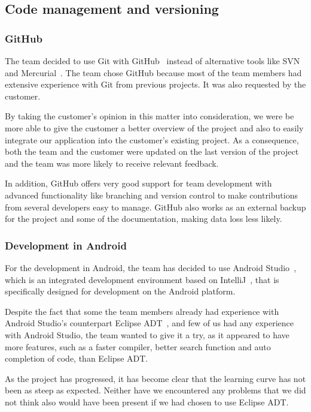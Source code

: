 \subsection{Code management and versioning}
\subsubsection{GitHub}
The team decided to use Git with GitHub~\cite{github} instead of alternative tools like SVN~\cite{svn} and Mercurial~\cite{mercurial}. 
The team chose GitHub because most of the team members had extensive experience with Git from previous projects. It was also requested by the customer. 

By taking the customer's opinion in this matter into consideration, we were be more able to give the customer a better overview of the project and also to easily integrate our application into the customer's existing project. As a consequence, both the team and the customer were updated on the last version of the project and the team was more likely to receive relevant feedback. 

In addition, GitHub offers very good support for team development 
with advanced functionality like branching and version control to make contributions from several developers easy 
to manage. GitHub also works as an external backup for the project and some of the documentation, making data loss less likely.

\subsubsection{Development in Android}
For the development in Android, the team has decided to use Android Studio~\cite{Android-studio}, which is an integrated development environment based on IntelliJ~\cite{intellij}, that is specifically designed for development on the Android platform.

Despite the fact that some the team members already had experience with Android Studio's counterpart Eclipse ADT~\cite{eclipseadt}, and few of us had any experience with Android Studio, the team wanted to give it a try, as it appeared to have more features, such as a faster compiler, better search function and auto completion of code, than Eclipse ADT. 

As the project has progressed, it has become clear that the learning curve has not been as steep as expected. Neither have we encountered any problems that we did not think also would have been present if we had chosen to use Eclipse ADT.

